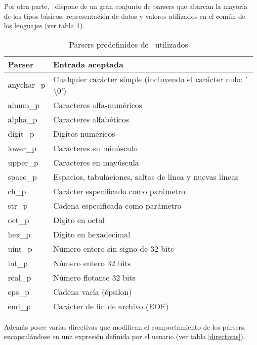 Por otra parte, \spirit\ dispone de un gran conjunto de parsers que abarcan la mayoría de los tipos básicos, representación de datos y valores utilizados en el común de los lenguajes (ver tabla \ref{parsers}).

\begin{table}[!ht]\centering\scriptsize
\begin{tabular}{| l | l |}
\hline

\rowcolor{gris} \textbf{Parser} & \textbf{Entrada aceptada} \\ \hline

anychar\_p & Cualquier carácter simple (incluyendo el carácter nulo: '$\setminus0$')\\ \hline
alnum\_p   & Caracteres alfa-numéricos \\ \hline
alpha\_p   & Caracteres alfabéticos \\ \hline
digit\_p   & Dígitos numéricos \\ \hline
lower\_p   & Caracteres en minúscula \\ \hline
upper\_p   & Caracteres en mayúscula \\ \hline
space\_p   & Espacios, tabulaciones, saltos de línea y nuevas líneas \\ \hline
ch\_p      & Carácter especificado como parámetro \\ \hline
str\_p     & Cadena especificada como parámetro \\ \hline
oct\_p     & Dígito en octal \\ \hline
hex\_p     & Dígito en hexadecimal \\ \hline
uint\_p    & Número entero sin signo de 32 bits \\ \hline
int\_p     & Número entero 32 bits \\ \hline
real\_p    & Número flotante 32 bits \\ \hline
eps\_p     & Cadena vacía (épsilon) \\ \hline
end\_p     & Carácter de fin de archivo (EOF) \\ \hline
\end{tabular}
\caption{\label{parsers} Parsers predefinidos de \spirit\ utilizados} 
\end{table}

Además posee varias directivas que modifican el comportamiento de los parsers, encapsulándose en una expresión definida por el usuario (ver tabla \ref{directivas}).

